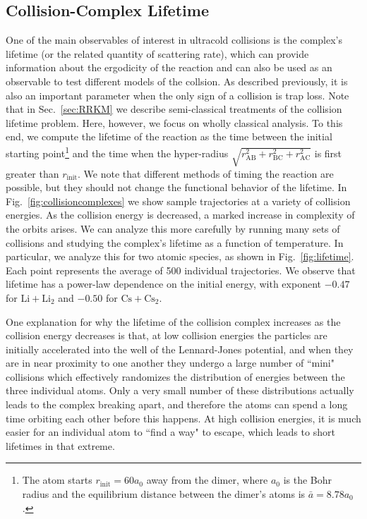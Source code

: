 \documentclass[%
 reprint,
 amsmath,amssymb,
 aps,
 nofootinbib
]{revtex4-1}
\begin{document}
\subsection{\label{sec:level2}Collision-Complex Lifetime}
One of the main observables of interest in ultracold collisions is the complex's lifetime (or the related quantity of scattering rate), which can provide information about the ergodicity of the reaction and can also be used as an observable to test different models of the collsion. As described previously, it is also an important parameter when the only sign of a collision is trap loss. Note that in Sec.~\ref{sec:RRKM} we describe semi-classical treatments of the collision lifetime problem. Here, however, we focus on wholly classical analysis. To this end, we compute the lifetime of the reaction as the time between the initial starting point\footnote{The atom starts $r_{\mathrm{init}} = 60 a_0$ away from the dimer, where $a_{\mathrm{0}}$ is the Bohr radius and the equilibrium distance between the dimer's atoms is $\bar{a} = 8.78 a_{\mathrm{0}}$.} and the time when the hyper-radius $\sqrt{r^2_{\mathrm{AB}} + r^2_{\mathrm{BC}} + r^2_{\mathrm{AC}}}$ is first greater than $ r_{\mathrm{init}}$. We note that different methods of timing the reaction are possible, but they should not change the functional behavior of the lifetime. In Fig.~\ref{fig:collisioncomplexes} we show sample trajectories at a variety of collision energies. As the collision energy is decreased, a marked increase in complexity of the orbits arises. We can analyze this more carefully by running many sets of collisions and studying the complex's lifetime as a function of temperature. In particular, we analyze this for two atomic species, as shown in Fig.~\ref{fig:lifetime}. Each point represents the average of 500 individual trajectories. We observe that lifetime has a power-law dependence on the initial energy, with exponent $-0.47$ for $\mathrm{Li} + \mathrm{Li_{2}}$ and $-0.50$ for $\mathrm{Cs} + \mathrm{Cs_{2}}$. 

One explanation for why the lifetime of the collision complex increases as the collision energy decreases is that, at low collision energies the particles are initially accelerated into the well of the Lennard-Jones potential, and when they are in near proximity to one another they undergo a large number of ``mini" collisions which effectively randomizes the distribution of energies between the three individual atoms. Only a very small number of these distributions actually leads to the complex breaking apart, and therefore the atoms can spend a long time orbiting each other before this happens. At high collision energies, it is much easier for an individual atom to ``find a way" to escape, which leads to short lifetimes in that extreme. 
\end{document}
